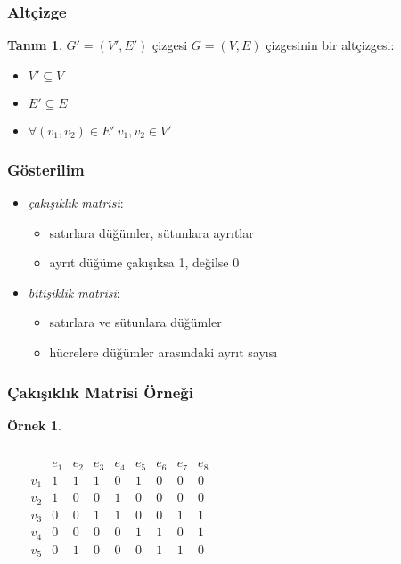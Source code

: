 \documentclass[dvipsnames]{beamer}
\theoremstyle{definition}
\newtheorem{tanim}[theorem]{Tanım}
\theoremstyle{example}
\newtheorem{ornek}[theorem]{Örnek}
\theoremstyle{plain}
\begin{document}
\begin{frame}
  \frametitle{Altçizge}

  \begin{tanim}
    $G'=(V',E')$ çizgesi $G=(V,E)$ çizgesinin bir \alert{altçizgesi}:

    \begin{itemize}
      \item $V' \subseteq V$
      \item $E' \subseteq E$
      \item $\forall (v_1,v_2) \in E'~v_1,v_2 \in V'$
    \end{itemize}
  \end{tanim}
\end{frame}

\begin{frame}
  \frametitle{Gösterilim}

  \begin{itemize}
    \item \emph{çakışıklık matrisi}:
    \begin{itemize}
      \item satırlara düğümler, sütunlara ayrıtlar
      \item ayrıt düğüme çakışıksa 1, değilse 0
    \end{itemize}

    \pause
    \medskip
    \item \emph{bitişiklik matrisi}:
    \begin{itemize}
      \item satırlara ve sütunlara düğümler
      \item hücrelere düğümler arasındaki ayrıt sayısı
    \end{itemize}
  \end{itemize}
\end{frame}

\begin{frame}
  \frametitle{Çakışıklık Matrisi Örneği}

  \begin{ornek}
    \begin{columns}
      \begin{center}
      \end{center}

      \[
        \begin{array}{c|cccccccc}
              & e_1 & e_2 & e_3 & e_4 & e_5 & e_6 & e_7 & e_8\\\hline
          v_1 & 1 & 1 & 1 & 0 & 1 & 0 & 0 & 0\\
          v_2 & 1 & 0 & 0 & 1 & 0 & 0 & 0 & 0\\
          v_3 & 0 & 0 & 1 & 1 & 0 & 0 & 1 & 1\\
          v_4 & 0 & 0 & 0 & 0 & 1 & 1 & 0 & 1\\
          v_5 & 0 & 1 & 0 & 0 & 0 & 1 & 1 & 0
        \end{array}
      \]
    \end{columns}
  \end{ornek}
\end{frame}
\end{document}
